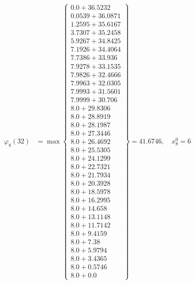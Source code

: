 \documentclass{article}
\begin{document}
\begin{align*}
\varphi_{8}(32) &= \max \left\{ \begin{array}{c}
0.0 + 36.5232 \\
 0.0539 + 36.0871 \\
 1.2595 + 35.6167 \\
 3.7307 + 35.2458 \\
 5.9267 + 34.8425 \\
 7.1926 + 34.4064 \\
 7.7386 + 33.936 \\
 7.9278 + 33.1535 \\
 7.9826 + 32.4666 \\
 7.9963 + 32.0305 \\
 7.9993 + 31.5601 \\
 7.9999 + 30.706 \\
 8.0 + 29.8306 \\
 8.0 + 28.8919 \\
 8.0 + 28.1987 \\
 8.0 + 27.3446 \\
 8.0 + 26.4692 \\
 8.0 + 25.5305 \\
 8.0 + 24.1299 \\
 8.0 + 22.7321 \\
 8.0 + 21.7934 \\
 8.0 + 20.3928 \\
 8.0 + 18.5978 \\
 8.0 + 16.2995 \\
 8.0 + 14.658 \\
 8.0 + 13.1148 \\
 8.0 + 11.7142 \\
 8.0 + 9.4159 \\
 8.0 + 7.38 \\
 8.0 + 5.9794 \\
 8.0 + 3.4365 \\
 8.0 + 0.5746 \\
 8.0 + 0.0
\end{array} \right\}=41.6746, \quad x_{8}^0=6\\
  

\end{align*}
\end{document}
